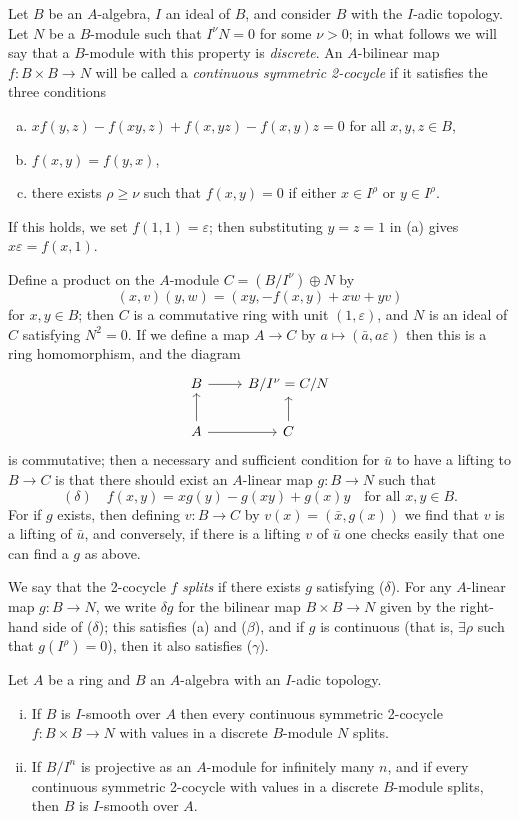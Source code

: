 Let $B$ be an $A$-algebra, $I$ an ideal of $B$, and consider $B$ with the $I$-adic
topology. Let $N$ be a $B$-module such that $I^\nu N = 0$ for some $\nu > 0$; in what
follows we will say that a $B$-module with this property is \emph{discrete}. An
$A$-bilinear map $f\colon B \times B \to N$ will be called a \emph{continuous symmetric
2-cocycle} if it satisfies the three conditions
\begin{enumerate}[(a)]
  \item $xf(y, z) - f(xy, z) + f(x, yz) - f(x, y)z = 0$ for all $x, y, z \in B$,
  \item[($\beta$)] $f(x, y) = f(y, x)$,
  \item[($\gamma$)] there exists $\rho \ge \nu$ such that $f(x, y) = 0$ if either $x \in I^\rho$ or $y \in I^\rho$.
\end{enumerate}
If this holds, we set $f(1, 1) = \varepsilon$; then substituting $y = z = 1$ in (a) gives
$x\varepsilon = f(x, 1)$.

Define a product on the $A$-module $C = (B/I^\nu) \oplus N$ by
\[
  (x, v)(y, w) = (xy, -f(x, y) + xw + yv)
\]
for $x, y \in B$; then $C$ is a commutative ring with unit $(1, \varepsilon)$, and $N$ is an
ideal of $C$ satisfying $N^2 = 0$. If we define a map $A \to C$ by $a \mapsto (\bar{a}, a\varepsilon)$
then this is a ring homomorphism, and the diagram
\[
\begin{tikzcd}
B \arrow[r] & B/I^\nu = C/N \\
A \arrow[u] \arrow[r] & C \arrow[u]
\end{tikzcd}
\]
is commutative; then a necessary and sufficient condition for $\bar{u}$ to have a lifting
to $B \to C$ is that there should exist an $A$-linear map $g\colon B \to N$ such that
\[
  (\delta) \quad f(x, y) = xg(y) - g(xy) + g(x)y \quad \text{for all } x, y \in B.
\]
For if $g$ exists, then defining $v\colon B \to C$ by $v(x) = (\bar{x}, g(x))$ we find that $v$
is a lifting of $\bar{u}$, and conversely, if there is a lifting $v$ of $\bar{u}$ one checks easily
that one can find a $g$ as above.

We say that the 2-cocycle $f$ \emph{splits} if there exists $g$ satisfying ($\delta$). For any
$A$-linear map $g\colon B \to N$, we write $\delta g$ for the bilinear map
$B \times B \to N$ given by the right-hand side of ($\delta$); this satisfies (a) and ($\beta$),
and if $g$ is continuous (that is, $\exists \rho$ such that $g(I^\rho) = 0$), then it also
satisfies ($\gamma$).

\begin{theorem}\label{thm:28.8}
Let $A$ be a ring and $B$ an $A$-algebra with an $I$-adic topology.
\begin{enumerate}[(i)]
  \item If $B$ is $I$-smooth over $A$ then every continuous symmetric 2-cocycle
        $f\colon B \times B \to N$ with values in a discrete $B$-module $N$ splits.
  \item If $B/I^n$ is projective as an $A$-module for infinitely many $n$, and if every
        continuous symmetric 2-cocycle with values in a discrete $B$-module splits,
        then $B$ is $I$-smooth over $A$.
\end{enumerate}
\end{theorem}

